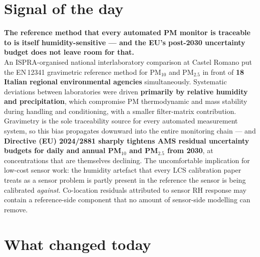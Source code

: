 \documentclass[10pt]{article}
\begin{document}
\vspace{6mm}

\section*{\sffamily\bfseries\color{Deep}Signal of the day}
\vspace{-1.5mm}{\color{Amber}\rule{\linewidth}{1.1pt}}\vspace{2.5mm}

\begin{keybox}
{\sffamily\bfseries\small\color{Deep}The reference method that every automated PM monitor
is traceable to is itself humidity-sensitive --- and the EU's post-2030 uncertainty budget
does not leave room for that.}\\[1.4mm]
\footnotesize
An ISPRA-organised national interlaboratory comparison at Castel Romano put the
EN\,12341 gravimetric reference method for PM$_{10}$ and PM$_{2.5}$ in front of
\textbf{18 Italian regional environmental agencies} simultaneously. Systematic deviations
between laboratories were driven \textbf{primarily by relative humidity and
precipitation}, which compromise PM thermodynamic and mass stability during handling and
conditioning, with a smaller filter-matrix contribution. Gravimetry is the sole
traceability source for every automated measurement system, so this bias propagates
downward into the entire monitoring chain --- and \textbf{Directive (EU) 2024/2881
sharply tightens AMS residual uncertainty budgets for daily and annual PM$_{10}$ and
PM$_{2.5}$ from 2030}, at concentrations that are themselves declining. The uncomfortable
implication for low-cost sensor work: the humidity artefact that every LCS calibration
paper treats as a sensor problem is partly present in the reference the sensor is being
calibrated \emph{against}. Co-location residuals attributed to sensor RH response may
contain a reference-side component that no amount of sensor-side modelling can remove.
\end{keybox}

\vspace{3mm}

\section*{\sffamily\bfseries\color{Deep}What changed today}
\vspace{-1.5mm}{\color{Amber}\rule{\linewidth}{1.1pt}}\vspace{2.5mm}
\end{document}
